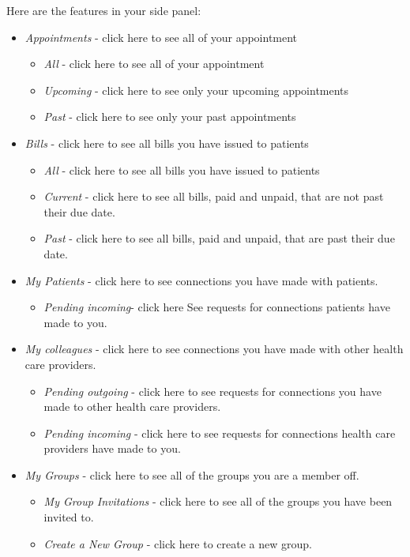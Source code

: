 Here are the features in your side panel:
\begin{itemize}
\item \textit{Appointments} - click here to see all of your appointment
\begin{itemize}
\item \textit{All} - click here to see all of your appointment
\item \textit{Upcoming} - click here to see only your upcoming appointments
\item \textit{Past} - click here to see only your past appointments
\end{itemize}
\item \textit{Bills} - click here to see all bills you have issued to patients
\begin{itemize} 
\item \textit{All} - click here to see all bills you have issued to patients
\item \textit{Current} - click here to see all bills, paid and unpaid, that are not past their due date.
\item \textit{Past}  - click here to see all bills, paid and unpaid, that are past their due date.
\end{itemize}
\item \textit{My Patients} - click here to see connections you have made with patients.
\begin{itemize}
\item \textit{Pending incoming}- click here See requests for connections patients have made to you.
\end{itemize}
\item \textit{My colleagues} - click here to see connections you have made with other health care providers.
\begin{itemize}
\item \textit{Pending outgoing} - click here to see requests for connections you have made to other health care providers.
\item \textit{Pending incoming} - click here to see requests for connections health care providers have made to you.
\end{itemize}
\item \textit{My Groups} - click here to see all of the groups you are a member off.
\begin{itemize}
\item \textit{My Group Invitations} - click here to see all of the groups you have been invited to.
\item \textit{Create a New Group} - click here to create a new group.

\end{itemize}
\end{itemize}
